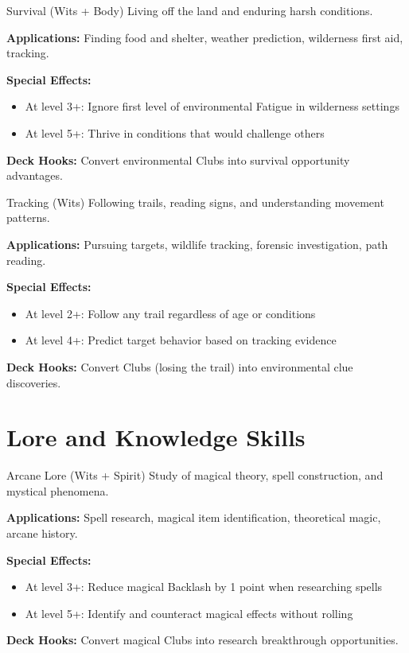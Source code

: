 \documentclass[11pt]{report}
\begin{document}
\begin{skillbox}{Survival (Wits + Body)}
Living off the land and enduring harsh conditions.

\textbf{Applications:} Finding food and shelter, weather prediction, wilderness first aid, tracking.

\textbf{Special Effects:}
\begin{itemize}
    \item At level 3+: Ignore first level of environmental Fatigue in wilderness settings
    \item At level 5+: Thrive in conditions that would challenge others
\end{itemize}

\textbf{Deck Hooks:} Convert environmental Clubs into survival opportunity advantages.
\end{skillbox}

\begin{skillbox}{Tracking (Wits)}
Following trails, reading signs, and understanding movement patterns.

\textbf{Applications:} Pursuing targets, wildlife tracking, forensic investigation, path reading.

\textbf{Special Effects:}
\begin{itemize}
    \item At level 2+: Follow any trail regardless of age or conditions
    \item At level 4+: Predict target behavior based on tracking evidence
\end{itemize}

\textbf{Deck Hooks:} Convert Clubs (losing the trail) into environmental clue discoveries.
\end{skillbox}

\section{Lore and Knowledge Skills}

\begin{skillbox}{Arcane Lore (Wits + Spirit)}
Study of magical theory, spell construction, and mystical phenomena.

\textbf{Applications:} Spell research, magical item identification, theoretical magic, arcane history.

\textbf{Special Effects:}
\begin{itemize}
    \item At level 3+: Reduce magical Backlash by 1 point when researching spells
    \item At level 5+: Identify and counteract magical effects without rolling
\end{itemize}

\textbf{Deck Hooks:} Convert magical Clubs into research breakthrough opportunities.
\end{skillbox}
\end{document}
